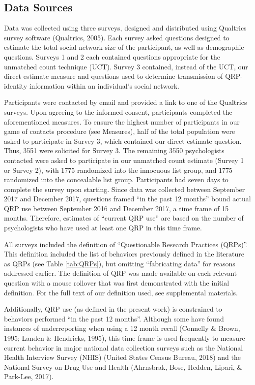 \documentclass[jou]{apa6}
\theoremstyle{definition}
\theoremstyle{definition}
\theoremstyle{definition}
\theoremstyle{remark}
\begin{document}
\subsection{Data Sources}\label{data-sources}

Data was collected using three surveys, designed and distributed using
Qualtrics survey software (Qualtrics, 2005). Each survey asked questions
designed to estimate the total social network size of the participant,
as well as demographic questions. Surveys 1 and 2 each contained
questions appropriate for the unmatched count technique (UCT). Survey 3
contained, instead of the UCT, our direct estimate measure and questions
used to determine transmission of QRP-identity information within an
individual's social network.

Participants were contacted by email and provided a link to one of the
Qualtrics surveys. Upon agreeing to the informed consent, participants
completed the aforementioned measures. To ensure the highest number of
participants in our game of contacts procedure (see Measures), half of
the total population were asked to participate in Survey 3, which
contained our direct estimate question. Thus, 3551 were solicited for
Survey 3. The remaining 3550 psychologists contacted were asked to
participate in our unmatched count estimate (Survey 1 or Survey 2), with
1775 randomized into the innocuous list group, and 1775 randomized into
the concealable list group. Participants had seven days to complete the
survey upon starting. Since data was collected between September 2017
and December 2017, questions framed \enquote{in the past 12 months}
bound actual QRP use between September 2016 and December 2017, a time
frame of 15 months. Therefore, estimates of \enquote{current QRP use}
are based on the number of psychologists who have used at least one QRP
in this time frame.

All surveys included the definition of \enquote{Questionable Research
Practices (QRPs)}. This definition included the list of behaviors
previously defined in the literature as QRPs (see Table \ref{tab:QRPs}),
but omitting \enquote{fabricating data} for reasons addressed earlier.
The definition of QRP was made available on each relevant question with
a mouse rollover that was first demonstrated with the initial
definition. For the full text of our definition used, see supplemental
materials.

Additionally, QRP use (as defined in the present work) is constrained to
behaviors performed \enquote{in the past 12 months}. Although some have
found instances of underreporting when using a 12 month recall (Connelly
\& Brown, 1995; Landen \& Hendricks, 1995), this time frame is used
frequently to measure current behavior in major national data collection
surveys such as the National Health Interview Survey (NHIS) (United
States Census Bureau, 2018) and the National Survey on Drug Use and
Health (Ahrnsbrak, Bose, Hedden, Lipari, \& Park-Lee, 2017).
\end{document}

